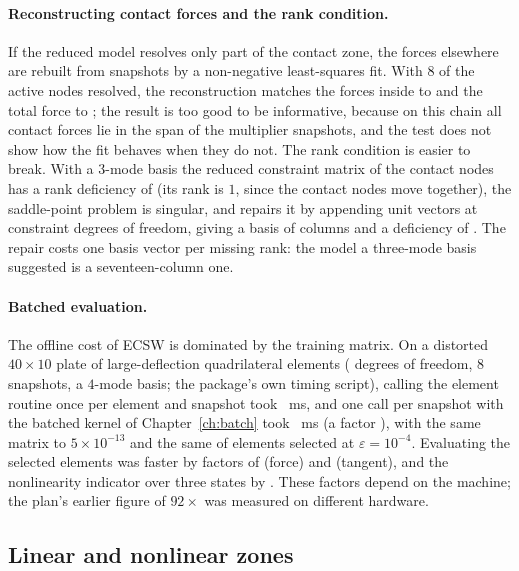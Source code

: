 \paragraph{Reconstructing contact forces and the rank condition.} If the reduced model resolves only part of the contact zone, the forces elsewhere are rebuilt from snapshots by a non-negative least-squares fit. With $8$ of the \cecNActive{} active nodes resolved, the reconstruction matches the forces inside to \cecRecIn{} and the total force to \cecRecTotal; the result is too good to be informative, because on this chain all contact forces lie in the span of the multiplier snapshots, and the test does not show how the fit behaves when they do not. The rank condition is easier to break. With a $3$-mode basis the reduced constraint matrix of the \cecNObs{} contact nodes has a rank deficiency of \cecRankDef{} (its rank is $1$, since the contact nodes move together), the saddle-point problem is singular, and  repairs it by appending \cecRankAdded{} unit vectors at constraint degrees of freedom, giving a basis of \cecRankCols{} columns and a deficiency of \cecRankAfter. The repair costs one basis vector per missing rank: the model a three-mode basis suggested is a seventeen-column one.

\paragraph{Batched evaluation.} The offline cost of ECSW is dominated by the training matrix. On a distorted $40\times10$ plate of \cbtElems{} large-deflection quadrilateral elements (\cbtDofs{} degrees of freedom, $8$ snapshots, a $4$-mode basis; the package's own timing script), calling the element routine once per element and snapshot took \cbtPer~ms, and one call per snapshot with the batched kernel of Chapter~\ref{ch:batch} took \cbtBat~ms (a factor \cbtSpeed), with the same matrix to $5\times10^{-13}$ and the same \cbtSelected{} of \cbtElems{} elements selected at $\varepsilon=10^{-4}$. Evaluating the selected elements was faster by factors of \cbtForceSpeed{} (force) and \cbtTangentSpeed{} (tangent), and the nonlinearity indicator over three states by \cbtIndSpeed. These factors depend on the machine; the plan's earlier figure of $92\times$ was measured on different hardware.

\subsection{Linear and nonlinear zones}

